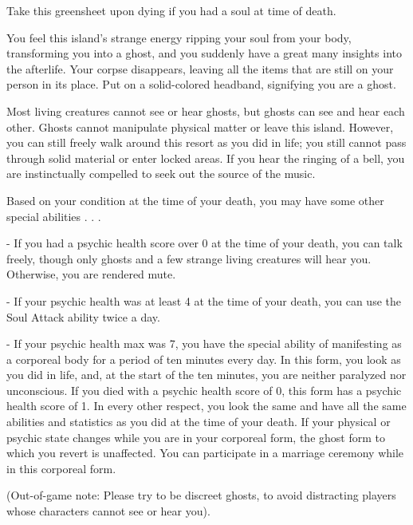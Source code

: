 \documentclass[green]{Kos}
\begin{document}
\name{\gGhost{}}

Take this greensheet upon dying if you had a soul at time of death.

You feel this island's strange energy ripping your soul from your body, transforming you into a ghost, and you suddenly have a great many insights into the afterlife. Your corpse disappears, leaving all the items that are still on your person in its place. Put on a solid-colored headband, signifying you are a ghost.

Most living creatures cannot see or hear ghosts, but ghosts can see and hear each other. Ghosts cannot manipulate physical matter or leave this island. However, you can still freely walk around this resort as you did in life; you still cannot pass through solid material or enter locked areas. If you hear the ringing of a bell, you are instinctually compelled to seek out the source of the music. 

Based on your condition at the time of your death, you may have some other special abilities . . . 

- If you had a psychic health score over 0 at the time of your death, you can talk freely, though only ghosts and a few strange living creatures will hear you. Otherwise, you are rendered mute.

- If your psychic health was at least 4 at the time of your death, you can use the Soul Attack ability twice a day. 

- If your psychic health max was 7, you have the special ability of manifesting as a corporeal body for a period of ten minutes every day. In this form, you look as you did in life, and, at the start of the ten minutes, you are neither paralyzed nor unconscious. If you died with a psychic health score of 0, this form has a psychic health score of 1. In every other respect, you look the same and have all the same abilities and statistics as you did at the time of your death. If your physical or psychic state changes while you are in your corporeal form, the ghost form to which you revert is unaffected. You can participate in a marriage ceremony while in this corporeal form.

(Out-of-game note: Please try to be discreet ghosts, to avoid distracting players whose characters cannot see or hear you).
\end{document}
